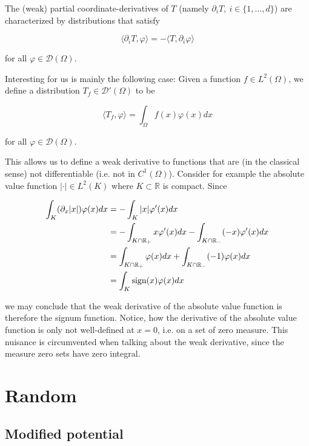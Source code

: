 \documentclass[11pt, a4paper]{article}
\begin{document}
The (weak) partial coordinate-derivatives of $T$ (namely $\partial_i T, ~i \in \{1, \dots, d\}$)
are characterized by distributions that satisfy

\begin{equation}
    \langle \partial_i T, \varphi \rangle = - \langle T, \partial_i \varphi \rangle 
\end{equation}

for all $\varphi \in \mathcal{D}(\Omega)$. 

Interesting for us is mainly the following case:
Given a function $f \in L^2(\Omega)$, we define a distribution $T_f \in \mathcal{D}'(\Omega)$
to be 

\begin{equation}
    \langle T_f , \varphi \rangle = \int_{\Omega} f(x) \varphi(x) dx
\end{equation}

for all $\varphi \in \mathcal{D}(\Omega)$.

This allows us to define a weak derivative to functions that are (in the classical
sense) not differentiable (i.e. not in $C^1(\Omega)$). Consider for example the 
absolute value function $|\cdot| \in L^2(K)$ where $K \subset \mathbb{R}$ is compact.
Since

\begin{align}
    \int_K (\partial_x |x|) \varphi(x) dx &= -\int_K |x| \varphi'(x) dx \notag \\ 
    &= - \int_{K \cap \mathbb{R}_+} x \varphi'(x) dx - \int_{K \cap \mathbb{R}_-} (-x) \varphi'(x) dx \notag \\ 
    &= \int_{K \cap \mathbb{R}_+} \varphi(x) dx + \int_{K \cap \mathbb{R}_-} (-1) \varphi(x) dx \notag \\
    &= \int_K \text{sign}(x) \varphi(x) dx
\end{align}

we may conclude that the weak derivative of the absolute value function is therefore
the signum function. Notice, how the derivative of the absolute value function
is only not well-defined at $x=0$, i.e. on a set of zero measure. This nuisance
is circumvented when talking about the weak derivative, since the measure zero
sets have zero integral.

\section{Random}
\label{sec:random}

\subsection{Modified potential}
\label{subsec:modpot}
\end{document}
